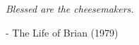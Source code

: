 
\vspace*{\fill}
\begin{center}
\textit{Blessed are the cheesemakers.}\par
\end{center}
\vspace*{\fill}
\begin{flushright}
- The Life of Brian (1979)
\end{flushright}